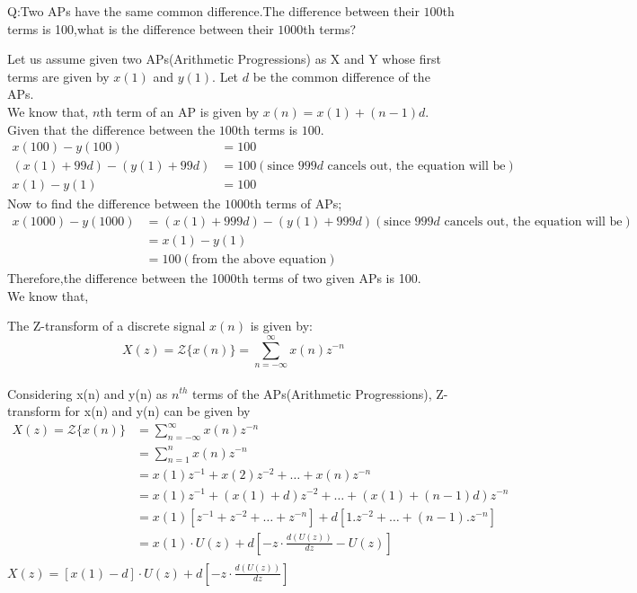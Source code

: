 \documentclass[journal,12pt,onecolumn]{IEEEtran}
\theoremstyle{remark}
\begin{document}
\let\vec\mathbf







\bigskip

\renewcommand{\thefigure}{\theenumi}
\renewcommand{\thetable}{\theenumi}

Q:Two APs have the same common difference.The difference between their $100${th} terms is 100,what is the difference between their $1000${th} terms?

\solution

Let us assume given two APs(Arithmetic Progressions) as X and Y whose first terms are given by $x(1)$ and $y(1)$. Let $d$ be the common difference of the APs. 
\\
We know that, $n$th term of an AP is given by $x(n) = x(1)+(n-1)d$.
\\
Given that the difference between the $100$th terms is $100$.
\begin{align}
x(100) - y(100) &= 100 \\
(x(1) + 99d) - (y(1) + 99d) &= 100
(\text{since $999d$ cancels out, the equation will be}) \\
x(1) - y(1) &= 100
\end{align}
Now to find the difference between the $1000$th terms of APs;
\begin{align}
x(1000) - y(1000) &= (x(1) + 999d) - (y(1) + 999d)
(\text{since $999d$ cancels out, the equation will be})\\
&= x(1) - y(1)\\
&= 100  
(\text{from the above equation})
\end{align}
Therefore,the difference between the 1000th terms of two given APs is 100.\\

We know that,

The Z-transform of a discrete signal $x(n)$ is given by:
\[ X(z) = \mathcal{Z}\{x(n)\} = \sum_{n=-\infty}^{\infty} x(n)z^{-n} \]
\\ Considering x(n) and y(n) as $n^{th}$ terms of the APs(Arithmetic Progressions), Z-transform for x(n) and y(n) can be given by
\begin{align}
X(z) = \mathcal{Z}\{x(n)\} 
&= \sum_{n=-\infty}^{\infty} x(n)z^{-n} \\
&=\sum_{n=1}^{n}x(n)z^{-n} \\
&=x(1)z^{-1}+x(2)z^{-2}+ \ldots +x(n)z^{-n} \\
&=x(1)z^{-1}+(x(1)+d)z^{-2}+ \ldots +(x(1)+(n-1)d)z^{-n} \\
&=x(1)[z^{-1} + z^{-2} + \ldots + z^{-n}] + d[1.z^{-2}+\ldots+(n-1).z^{-n}] \\
&=x(1)\cdot U(z) + d[-z \cdot \frac{d(U(z))}{dz} - U(z)]\\
\end{align}
$X(z) = [x(1)-d]\cdot U(z) + d[-z \cdot \frac {d(U(z))}{dz}]  $ \\
\end{document}
